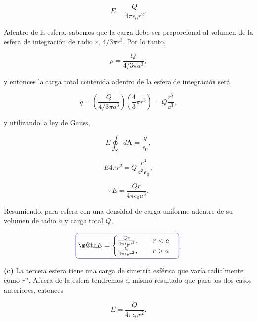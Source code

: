 \documentclass[a4paper,11pt]{article}
\makeatletter
\numberwithin{equation}{section}
\newcommand*{\boxcolor}{blue}
\renewcommand{\boxed}[1]{\textcolor{\boxcolor}{%
\tikz[baseline={([yshift=-1ex]current bounding box.center)}] \node [rectangle, minimum width=1ex,rounded corners,draw] {\normalcolor\m@th$\displaystyle#1$};}}
\makeatother
\begin{document}
\begin{equation}
 E = \frac{Q}{4\pi \epsilon_0 r^2}.
\end{equation}

Adentro de la esfera, sabemos que la carga debe ser proporcional al volumen de la 
esfera de integración de radio $r$, $4/3\pi r^3$. Por lo tanto, 

\begin{equation}
 \rho = \frac{Q}{4/3\pi a^3},
\end{equation}

y entonces la carga total contenida adentro de la esfera de integración será

\begin{equation}
 q = \left(\frac{Q}{4/3\pi a^3}\right)\left(\frac{4}{3}\pi r^3\right) = 
 Q\frac{r^3}{a^3}, 
\end{equation}

y utilizando la ley de Gauss, 

\begin{equation}
 E \oint_S d\mathbf{A} = \frac{q}{\epsilon_0},
\end{equation}

\begin{equation}
 E 4\pi r^2 = Q\frac{r^3}{a^3\epsilon_0},
\end{equation}

\begin{equation}
 \therefore E = \frac{Qr}{4\pi \epsilon_0 a^3}.
\end{equation}

Resumiendo, para esfera con una densidad de carga 
uniforme adentro de su volumen de radio $a$ y carga total $Q$,

\begin{equation}
\boxed{
  E =\begin{cases}
	      \frac{Qr}{4\pi \epsilon_0 a^3} , \quad  \quad r < a \\
	      \frac{Q}{4\pi \epsilon_0 r^2} , \quad \quad r > a
	       \end{cases}}.
\end{equation}

\textbf{(c)} La tercera esfera tiene una carga de simetría esférica que varía 
radialmente como $r^n$. Afuera de la esfera tendremos el mismo resultado que 
para los dos casos anteriores, entonces 

\begin{equation}
 E = \frac{Q}{4\pi \epsilon_0 r^2}.
\end{equation}
\end{document}
